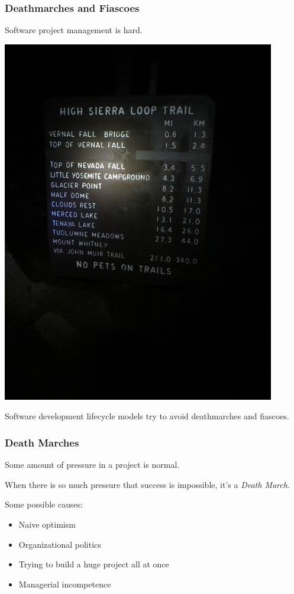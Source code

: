 \begin{frame}
\frametitle{Deathmarches and Fiascoes}

\begin{changemargin}{1cm}
Software project management is hard.\\[1em]

\begin{center}
\includegraphics[width=.4\textwidth]{images/7897_trail_sign}
\end{center}

Software development lifecycle models try to avoid deathmarches and fiascoes.

\end{changemargin}
\end{frame}

\begin{frame}
\frametitle{Death Marches}

\begin{changemargin}{1cm}
Some amount of pressure in a project is normal.

When there is so much pressure that success is impossible, it's a \textit{Death March}.

Some possible causes:\\
\begin{itemize}
	\item Naive optimism
	\item Organizational politics
	\item Trying to build a huge project all at once
	\item Managerial incompetence
\end{itemize}
\end{changemargin}
\end{frame}


